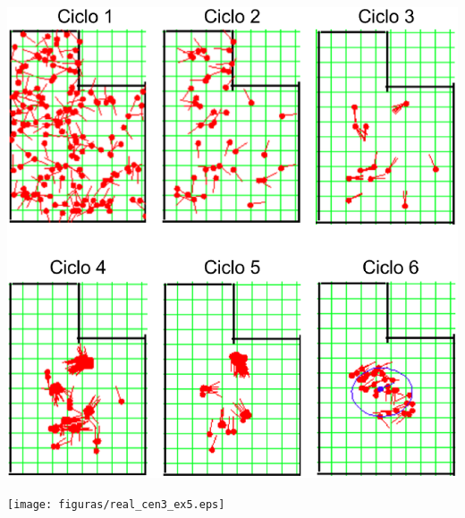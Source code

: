 {\centering
\includegraphics[scale=0.4]{figuras/cen3_ex5.eps}
\label{img:cen3_ex5}
\par}

{\centering
\texttt{[image: figuras/real\_cen3\_ex5.eps]}
\label{img:real_cen3_ex5}
\par}

